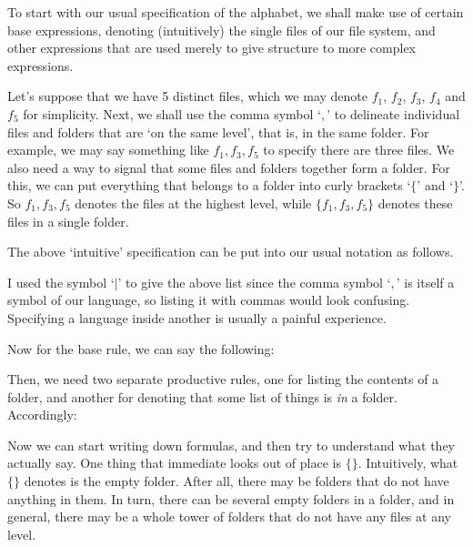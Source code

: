 To start with our usual specification of the alphabet, we shall make use of certain base expressions, denoting (intuitively) the single files of our file system, and other expressions that are used merely to give structure to more complex expressions. 

Let's suppose that we have 5 distinct files, which we may denote $f_1$, $f_2$, $f_3$, $f_4$ and $f_5$ for simplicity. Next, we shall use the comma symbol `$,$' to delineate individual files and folders that are `on the same level', that is, in the same folder. For example, we may say something like $f_1, f_3, f_5$ to specify there are three files. We also need a way to signal that some files and folders together form a folder. For this, we can put everything that belongs to a folder into curly brackets `$\{$' and `$\}$'. So $f_1, f_3, f_5$ denotes the files at the highest level, while $\{f_1, f_3, f_5\}$ denotes these files in a single folder. 

The above `intuitive' specification can be put into our usual notation as follows.


I used the symbol `$\mid$' to give the above list since the comma symbol `$,$' is itself a symbol of our language, so listing it with commas would look confusing. Specifying a language inside another is usually a painful experience. 

Now for the base rule, we can say the following:


Then, we need two separate productive rules, one for listing the contents of a folder, and another for denoting that some list of things is \textit{in} a folder. Accordingly:



Now we can start writing down formulas, and then try to understand what they actually say. One thing that immediate looks out of place is $\{\}$. Intuitively, what $\{\}$ denotes is the empty folder. After all, there may be folders that do not have anything in them. In turn, there can be several empty folders in a folder, and in general, there may be a whole tower of folders that do not have any files at any level. 

